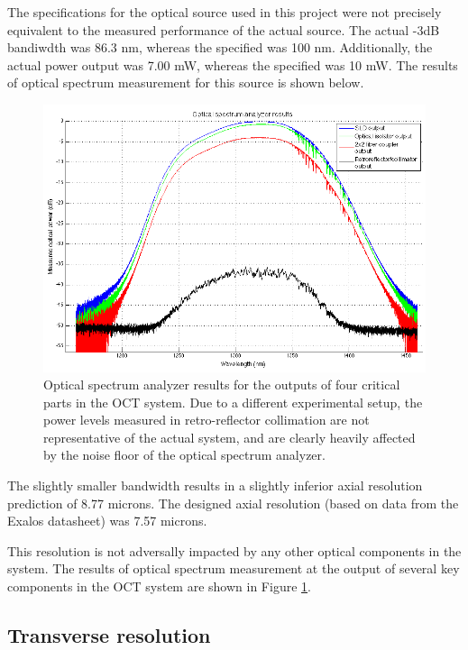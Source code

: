 The specifications for the optical source used in this project were not precisely equivalent to the measured performance of the actual source. The actual -3dB bandiwdth was 86.3 nm, whereas the specified was 100 nm. Additionally, the actual power output was 7.00 mW, whereas the specified was 10 mW. The results of optical spectrum measurement for this source is shown below.

\begin{figure}[h!]
\centering
\includegraphics[width=1.0\textwidth]{Images/System/osa.png}
\caption{Optical spectrum analyzer results for the outputs of four critical parts in the OCT system. Due to a different experimental setup, the power levels measured in retro-reflector collimation are not representative of the actual system, and are clearly heavily affected by the noise floor of the optical spectrum analyzer. \label{fig:osa}}
\end{figure}

The slightly smaller bandwidth results in a slightly inferior axial resolution prediction of 8.77 microns. The designed axial resolution (based on data from the Exalos datasheet) was 7.57 microns.

This resolution is not adversally impacted by any other optical components in the system. The results of optical spectrum measurement at the output of several key components in the OCT system are shown in Figure \ref{fig:osa}.


\subsection{Transverse resolution}


